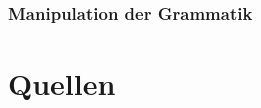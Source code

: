 \documentclass[a4paper,12pt]{article}
\begin{document}
\subsubsection*{Manipulation der Grammatik}






\newpage
\section{Quellen}





\end{document}
